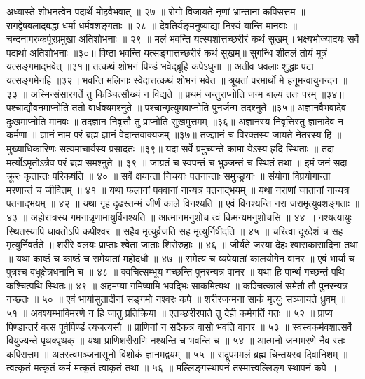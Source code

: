 अध्यास्ते शोभनत्वेन पदार्थे मोहवैभवात् ॥ २७ ॥
रोगो विजायते नृणां भ्रान्तानां कपिसत्तम ॥
रागद्वेषबलाद्बद्धा धर्मा धर्मवशङ्गताः ॥ २८ ॥
देवतिर्यङ्मनुष्याद्या निरयं यान्ति मानवाः ॥
चन्दनागरुकर्पूरप्रमुखा अतिशोभनाः ॥ २९ ॥
मलं भवन्ति यत्स्पर्शात्तच्छरीरं कथं सुखम्॥
भक्ष्यभोज्यादयः सर्वे पदार्था अतिशोभनाः ॥३०॥
विष्ठा भवन्ति यत्सङ्गात्तच्छरीरं कथं सुखम्॥
सुगन्धि शीतलं तोयं मूत्रं यत्सङ्गमाद्भवेत् ॥३१॥
तत्कथं शोभनं पिण्डं भवेद्ब्रूहि कपेऽधुना ॥
अतीव धवलाः शुद्धाः पटा यत्सङ्गमेनहि ॥३२॥
भवन्ति मलिनाः स्वेदात्तत्कथं शोभनं भवेत ॥
श्रूयतां परमार्थो मे हनूमन्वायुनन्दन ॥ ३३ ॥
अस्मिन्संसारगर्ते तु किञ्चित्सौख्यं न विद्यते ॥
प्रथमं जन्तुराप्नोति जन्म बाल्यं ततः परम् ॥३४॥
पश्चाद्यौवनमाप्नोति ततो वार्धक्यमश्नुते ॥
पश्चान्मृत्युमवाप्नोति पुनर्जन्म तदश्नुते ॥३५॥
अज्ञानवैभवादेव दुःखमाप्नोति मानवः ॥
तदज्ञान निवृत्तौ तु प्राप्नोति सुखमुत्तमम् ॥३६॥
अज्ञानस्य निवृत्तिस्तु ज्ञानादेव न कर्मणा ॥
ज्ञानं नाम परं ब्रह्म ज्ञानं वेदान्तवाक्यजम् ॥३७॥
तज्ज्ञानं च विरक्तस्य जायते नेतरस्य हि ॥
मुख्याधिकारिणः सत्यमाचार्यस्य प्रसादतः ॥३९॥
यदा सर्वे प्रमुच्यन्ते कामा येऽस्य हृदि स्थिताः ॥
तदा मर्त्योऽमृतोऽत्रैव परं ब्रह्म समश्नुते ॥ ३९ ॥
जाग्रतं च स्वपन्तं च भुञ्जन्तं च स्थितं तथा ॥
इमं जनं सदा क्रूरः कृतान्तः परिकर्षति ॥ ४० ॥
सर्वे क्षयान्ता निचयाः पतनान्ताः समुच्छ्रयाः ॥
संयोगा विप्रयोगान्ता मरणान्तं च जीवितम् ॥ ४१ ॥
यथा फलानां पक्वानां नान्यत्र पतनाद्भयम् ॥
यथा नराणां जातानां नान्यत्र पतनाद्भयम् ॥ ४२ ॥
यथा गृहं दृढस्तम्भं जीर्णं काले विनश्यति ॥
एवं विनश्यन्ति नरा जरामृत्युवशङ्गताः ॥ ४३ ॥
अहोरात्रस्य गमनान्नृणामायुर्विनश्यति ॥
आत्मानमनुशोच त्वं किमन्यमनुशोचसि ॥ ४४ ॥
नश्यत्यायुः स्थितस्यापि धावतोऽपि कपीश्वर ॥
सहैव मृत्युर्व्रजति सह मृत्युर्निषीदति ॥ ४५ ॥
चरित्वा दूरदेशं च सह मृत्युर्निवर्तते ॥
शरीरे वलयः प्राप्ताः श्वेता जाताः शिरोरुहाः ॥ ४६ ॥
जीर्यते जरया देहः श्वासकासादिना तथा ॥
यथा काष्ठं च काष्ठं च समेयातां महोदधौ ॥ ४७ ॥
समेत्य च व्यपेयातां कालयोगेन वानर ॥
एवं भार्या च पुत्रश्च वधुक्षेत्रधनानि च ॥ ४८ ॥
क्वचित्सम्भूय गच्छन्ति पुनरन्यत्र वानर ॥
यथा हि पान्थं गच्छन्तं पथि कश्चित्पथि स्थितः॥ ४९ ॥
अहमप्या गमिष्यामि भवद्भिः साकमित्यथ ॥
कञ्चित्कालं समेतौ तौ पुनरन्यत्र गच्छतः ॥ ५० ॥
एवं भार्यासुतादीनां सङ्गमो नश्वरः कपे ॥
शरीरजन्मना साकं मृत्युः सञ्जायते ध्रुवम् ॥ ५१ ॥
अवश्यम्भाविमरणे न हि जातु प्रतिक्रिया ॥
एतच्छरीरपाते तु देही कर्मगतिं गतः ॥ ५२ ॥
प्राप्य पिण्डान्तरं वत्स पूर्वपिण्डं त्यजत्यसौ ॥
प्राणिनां न सदैकत्र वासो भवति वानर ॥ ५३ ॥
स्वस्वकर्मवशात्सर्वे वियुज्यन्ते पृथक्पृथक् ॥
यथा प्राणिशरीराणि नश्यन्ति च भवन्ति च ॥ ५४ ॥
आत्मनो जन्ममरणे नैव स्तः कपिसत्तम ॥
अतस्त्वमञ्जनासूनो विशोकं ज्ञानमद्वयम् ॥ ५५ ॥
सद्रूपममलं ब्रह्म चिन्तयस्व दिवानिशम् ॥
त्वत्कृतं मत्कृतं कर्म मत्कृतं त्वाकृतं तथा ॥ ५६ ॥
मल्लिङ्गस्थापनं तस्मात्त्वल्लिङ्ग स्थापनं कपे ॥
